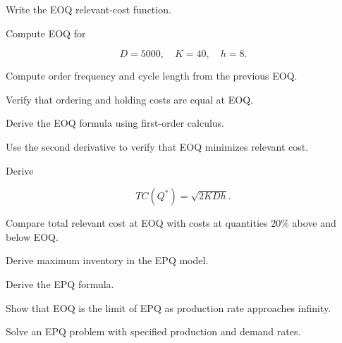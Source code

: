 \begin{exercise}[2]
Write the EOQ relevant-cost function.
\end{exercise}

\begin{exercise}[2]
Compute EOQ for

\[
D=5000,
\quad
K=40,
\quad
h=8.
\]
\end{exercise}

\begin{exercise}[2]
Compute order frequency and cycle length from the previous EOQ.
\end{exercise}

\begin{exercise}[2]
Verify that ordering and holding costs are equal at EOQ.
\end{exercise}

\begin{exercise}[3]
Derive the EOQ formula using first-order calculus.
\end{exercise}

\begin{exercise}[3]
Use the second derivative to verify that EOQ minimizes relevant cost.
\end{exercise}

\begin{exercise}[3]
Derive

\[
TC(Q^*)
=
\sqrt{2KDh}.
\]
\end{exercise}

\begin{exercise}[3]
Compare total relevant cost at EOQ with costs at quantities \(20\%\)
above and below EOQ.
\end{exercise}

\begin{exercise}[3]
Derive maximum inventory in the EPQ model.
\end{exercise}

\begin{exercise}[3]
Derive the EPQ formula.
\end{exercise}

\begin{exercise}[3]
Show that EOQ is the limit of EPQ as production rate approaches infinity.
\end{exercise}

\begin{exercise}[3]
Solve an EPQ problem with specified production and demand rates.
\end{exercise}

